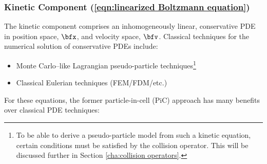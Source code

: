 \subsubsection*{Kinetic Component (\ref{eqn:linearized Boltzmann equation})}
    The kinetic component comprises an inhomogeneously linear, conservative PDE in position space, $\bfx$, and velocity space, $\bfv$. Classical techniques for the numerical solution of conservative PDEs include:
    \begin{itemize}
        \item  Monte Carlo--like Lagrangian pseudo-particle techniques\footnote{To be able to derive a pseudo-particle model from such a kinetic equation, certain conditions must be satisfied by the collision operator. This will be discussed further in Section \ref{cha:collision operators}.}
        \item  Classical Eulerian techniques (FEM/FDM/etc.)
    \end{itemize}
    For these equations, the former particle-in-cell (PiC) approach has many benefits over classical PDE techniques: 
